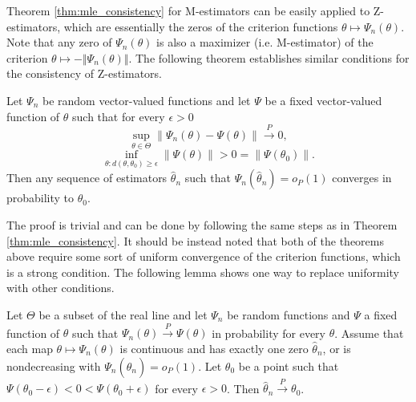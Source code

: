 \documentclass{article}
\begin{document}
Theorem \ref{thm:mle_consistency} for M-estimators can be easily applied to Z-estimators, which are essentially the zeros of the criterion functions $\theta \mapsto \Psi_n(\theta)$. Note that any zero of $\Psi_n(\theta)$ is also a maximizer (i.e. M-estimator) of the criterion $\theta \mapsto -\Vert\Psi_n(\theta)\Vert$. The following theorem establishes similar conditions for the consistency of Z-estimators.
\begin{theorem}\label{thm:z_consistency}
    Let $\Psi_n$ be random vector-valued functions and let $\Psi$ be a fixed vector-valued function of $\theta$ such that for every $\epsilon > 0$
    \begin{equation}
    \sup_{\theta \in \Theta} \| \Psi_n(\theta) - \Psi(\theta) \| \overset{P}{\rightarrow} 0,
    \end{equation}
    \begin{equation}
    \inf_{\theta : d(\theta, \theta_0) \geq \epsilon} \| \Psi(\theta) \| > 0 = \| \Psi(\theta_0) \|.
    \end{equation}
    Then any sequence of estimators $\hat{\theta}_n$ such that $\Psi_n(\hat{\theta}_n) = o_P(1)$ converges in probability to $\theta_0$.
\end{theorem}
The proof is trivial and can be done by following the same steps as in Theorem \ref{thm:mle_consistency}. It should be instead noted that both of the theorems above require some sort of uniform convergence of the criterion functions, which is a strong condition. The following lemma shows one way to replace uniformity with other conditions.
\begin{lemma}
    Let $\Theta$ be a subset of the real line and let $\Psi_n$ be random functions and $\Psi$ a fixed function of $\theta$ such that $\Psi_n(\theta) \overset{P}{\rightarrow} \Psi(\theta)$ in probability for every $\theta$. Assume that each map $\theta \mapsto \Psi_n(\theta)$ is continuous and has exactly one zero $\hat{\theta}_n$, or is nondecreasing with $\Psi_n(\hat{\theta}_n) = o_P(1)$. Let $\theta_0$ be a point such that $\Psi(\theta_0 - \epsilon) < 0 < \Psi(\theta_0 + \epsilon)$ for every $\epsilon > 0$. Then $\hat{\theta}_n \overset{P}{\rightarrow} \theta_0$.
\end{lemma}
\end{document}
